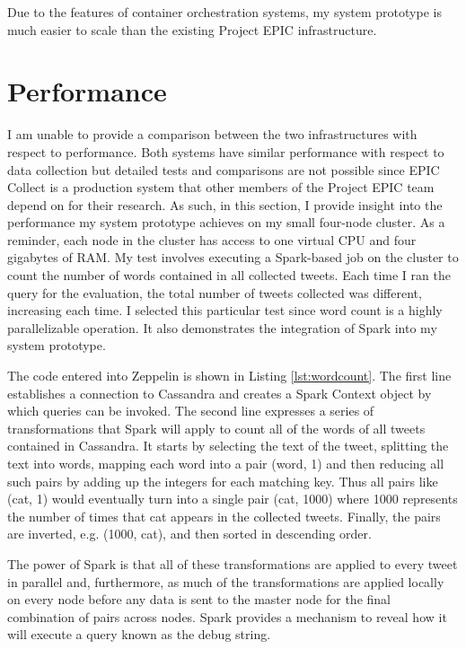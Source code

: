 Due to the features of container orchestration systems, my system prototype is much easier to scale than the existing Project EPIC infrastructure.

\section{Performance}

I am unable to provide a comparison between the two infrastructures with respect to performance. Both systems have similar performance with respect to data collection but detailed tests and comparisons are not possible since EPIC Collect is a production system that other members of the Project EPIC team depend on for their research. As such, in this section, I provide insight into the performance my system prototype achieves on my small four-node cluster. As a reminder, each node in the cluster has access to one virtual CPU and four gigabytes of RAM. My test involves executing a Spark-based job on the cluster to count the number of words contained in all collected tweets. Each time I ran the query for the evaluation, the total number of tweets collected was different, increasing each time. I selected this particular test since word count is a highly parallelizable operation. It also demonstrates the integration of Spark into my system prototype.

The code entered into Zeppelin is shown in Listing \ref{lst:wordcount}.  The first line establishes a connection to Cassandra and creates a Spark Context object by which queries can be invoked. The second line expresses a series of transformations that Spark will apply to count all of the words of all tweets contained in Cassandra. It starts by selecting the text of the tweet, splitting the text into words, mapping each word into a pair (word, 1) and then reducing all such pairs by adding up the integers for each matching key. Thus all pairs like (cat, 1) would eventually turn into a single pair (cat, 1000) where 1000 represents the number of times that cat appears in the collected tweets. Finally, the pairs are inverted, e.g. (1000, cat), and then sorted in descending order.

The power of Spark is that all of these transformations are applied to every tweet in parallel and, furthermore, as much of the transformations are applied locally on every node before any data is sent to the master node for the final combination of pairs across nodes. Spark provides a mechanism to reveal how it will execute a query known as the debug string.

